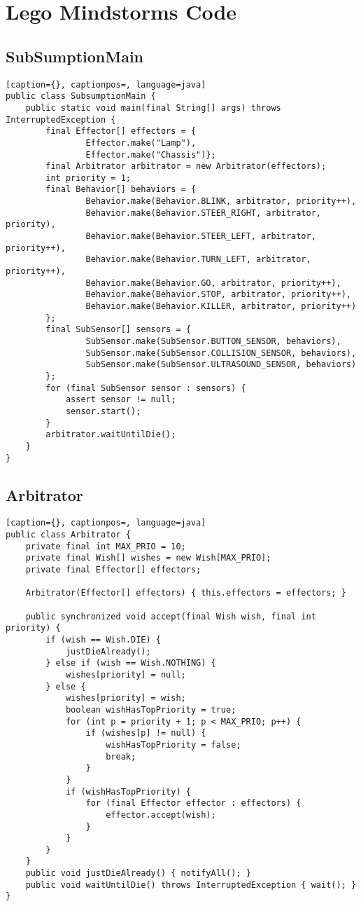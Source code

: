 \chapter{Lego Mindstorms Code}
\vspace{-40px}
\section{SubSumptionMain}
\begin{lstlisting}[caption={}, captionpos=, language=java]
public class SubsumptionMain {
    public static void main(final String[] args) throws InterruptedException {
        final Effector[] effectors = {
                Effector.make("Lamp"),
                Effector.make("Chassis")};
        final Arbitrator arbitrator = new Arbitrator(effectors);
        int priority = 1;
        final Behavior[] behaviors = {
				Behavior.make(Behavior.BLINK, arbitrator, priority++),
				Behavior.make(Behavior.STEER_RIGHT, arbitrator, priority),
				Behavior.make(Behavior.STEER_LEFT, arbitrator, priority++),
				Behavior.make(Behavior.TURN_LEFT, arbitrator, priority++),
                Behavior.make(Behavior.GO, arbitrator, priority++),
                Behavior.make(Behavior.STOP, arbitrator, priority++),
                Behavior.make(Behavior.KILLER, arbitrator, priority++)
        };
        final SubSensor[] sensors = {
                SubSensor.make(SubSensor.BUTTON_SENSOR, behaviors),
                SubSensor.make(SubSensor.COLLISION_SENSOR, behaviors),
                SubSensor.make(SubSensor.ULTRASOUND_SENSOR, behaviors)
        };
        for (final SubSensor sensor : sensors) {
            assert sensor != null;
            sensor.start();
        }
        arbitrator.waitUntilDie();
    }
}
\end{lstlisting}

\section{Arbitrator}
\begin{lstlisting}[caption={}, captionpos=, language=java]
public class Arbitrator {
    private final int MAX_PRIO = 10;
    private final Wish[] wishes = new Wish[MAX_PRIO];
    private final Effector[] effectors;

    Arbitrator(Effector[] effectors) { this.effectors = effectors; }

    public synchronized void accept(final Wish wish, final int priority) {
        if (wish == Wish.DIE) {
			justDieAlready();
		} else if (wish == Wish.NOTHING) {
			wishes[priority] = null;
		} else {
            wishes[priority] = wish;
            boolean wishHasTopPriority = true;
            for (int p = priority + 1; p < MAX_PRIO; p++) {
                if (wishes[p] != null) {
                    wishHasTopPriority = false;
                    break;
                }
            }
            if (wishHasTopPriority) {
                for (final Effector effector : effectors) {
                    effector.accept(wish);
                }
            }
        }
    }
    public void justDieAlready() { notifyAll(); }
    public void waitUntilDie() throws InterruptedException { wait(); }
}
\end{lstlisting}

